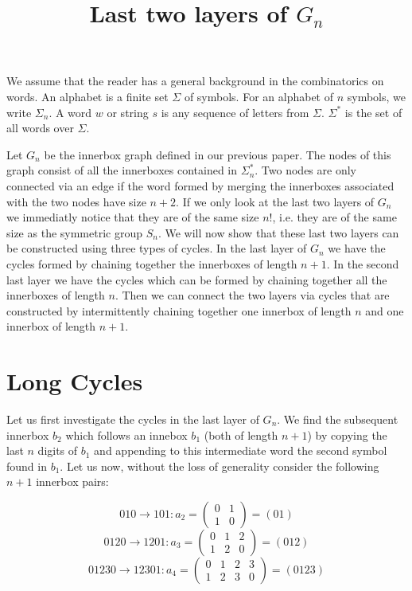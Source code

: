\documentclass[a4paper,10pt]{article}
\title{Last two layers of $G_n$}
\author{}
\begin{document}
\maketitle


We assume that the reader has a general background in the combinatorics on words. An alphabet is a finite set $\Sigma$ of symbols. For an alphabet of $n$ symbols, we write $\Sigma_n$. A word $w$ or string $s$ is any sequence of letters from $\Sigma$. $\Sigma^{*}$ is the set of all words over $\Sigma$.

Let $G_n$ be the innerbox graph defined in our previous paper. The nodes of this graph consist of all the innerboxes contained in $\Sigma_n^*$. Two nodes are only connected via an edge if the word formed by merging the innerboxes associated with the two nodes have size $n+2$. If we only look at the last two layers of $G_n$ we immediatly notice that they are of the same size $n!$, i.e. they are of the same size as the symmetric group $S_n$. We will now show that these last two layers can be constructed using three types of cycles. In the last layer of $G_n$ we have the cycles formed by chaining together the innerboxes of length $n+1$. In the second last layer we have the cycles which can be formed by chaining together all the innerboxes of length $n$. Then we can connect the two layers via cycles that are constructed by intermittently chaining together one innerbox of length $n$ and one innerbox of length $n+1$.  


\section{Long Cycles}
Let us first investigate the cycles in the last layer of $G_n$. We find the subsequent innerbox $b_2$ which follows an innebox $b_1$ (both of length $n+1$) by copying the last $n$ digits of $b_1$ and appending to this intermediate word the second symbol found in $b_1$.   Let us now, without the loss of generality consider the following $n+1$ innerbox pairs:

\begin{equation}
010\rightarrow101:a_2=\begin{pmatrix}
0&1\\
1&0
\end{pmatrix} = (01)
\end{equation}
\begin{equation}
0120\rightarrow1201:a_3=\begin{pmatrix}
0&1&2\\
1&2&0
\end{pmatrix} = (012)
\end{equation}
\begin{equation}
01230\rightarrow12301:a_4=\begin{pmatrix}
0&1&2&3\\
1&2&3&0
\end{pmatrix} = (0123)
\end{equation}
\end{document}
